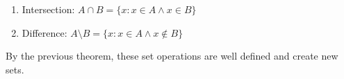 \begin{corollary}{}{}
    \begin{enumerate}
        \item Intersection: $A \cap B = \{x:x \in A \land x \in B\}$\\
        \item Difference: $A \setminus B = \{x:x \in A \land x \notin B\}$ \\
    \end{enumerate}
    By the previous theorem, these set operations are well defined and create new sets.
\end{corollary}

